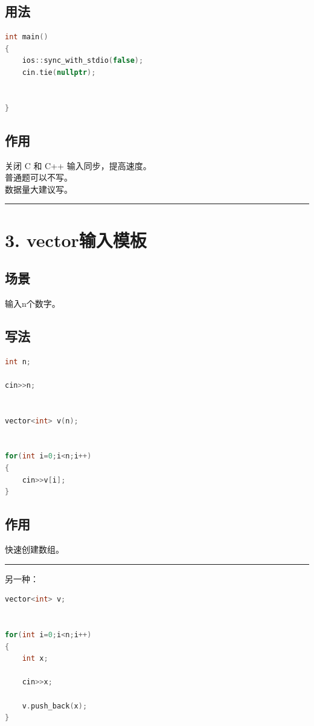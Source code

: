 \documentclass[9pt,twocolumn]{extarticle}
\begin{document}
\subsection{用法}
\begin{lstlisting}[language=C++]
int main()
{
    ios::sync_with_stdio(false);
    cin.tie(nullptr);


}
\end{lstlisting}

\subsection{作用}
关闭 C 和 C++ 输入同步，提高速度。\\
普通题可以不写。\\
数据量大建议写。

\noindent\rule{\linewidth}{0.4pt}

\section{3. vector输入模板}

\subsection{场景}
输入n个数字。

\subsection{写法}
\begin{lstlisting}[language=C++]
int n;

cin>>n;


vector<int> v(n);


for(int i=0;i<n;i++)
{
    cin>>v[i];
}
\end{lstlisting}

\subsection{作用}
快速创建数组。

\noindent\rule{\linewidth}{0.4pt}

另一种：
\begin{lstlisting}[language=C++]
vector<int> v;


for(int i=0;i<n;i++)
{
    int x;

    cin>>x;

    v.push_back(x);
}
\end{lstlisting}
\end{document}
